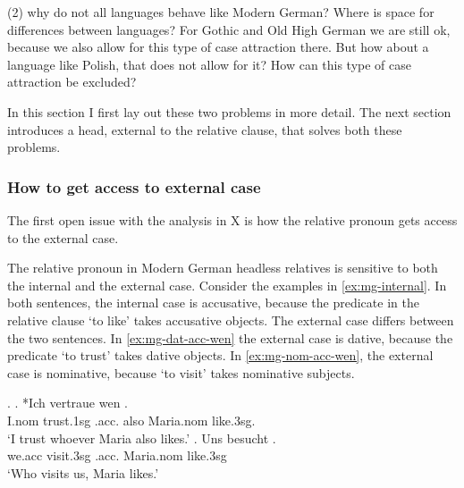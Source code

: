 (2) why do not all languages behave like Modern German? Where is space for differences between languages? For Gothic and Old High German we are still ok, because we also allow for this type of case attraction there. But how about a language like Polish, that does not allow for it? How can this type of case attraction be excluded?


In this section I first lay out these two problems in more detail. The next section introduces a head, external to the relative clause, that solves both these problems.


\subsubsection{How to get access to external case}

The first open issue with the analysis in X is how the relative pronoun gets access to the external case.

The relative pronoun in Modern German headless relatives is sensitive to both the internal and the external case. Consider the examples in \ref{ex:mg-internal}. In both sentences, the internal case is accusative, because the predicate in the relative clause  `to like' takes accusative objects. The external case differs between the two sentences. In \ref{ex:mg-dat-acc-wen} the external case is dative, because the predicate  `to trust' takes dative objects.  In \ref{ex:mg-nom-acc-wen}, the external case is nominative, because  `to visit' takes nominative subjects.

\ex.\label{ex:mg-internal}
\ag. *Ich vertraue wen   . \\
I.\ac{nom} trust.1\ac{sg}\scsub{[dat]} .\ac{acc}. also Maria.\ac{nom} like.3\ac{sg}\scsub{[acc]}.\\
`I trust whoever Maria also likes.' \label{ex:mg-dat-acc-wen}
\bg. Uns besucht   .\\
 we.\ac{acc} visit.3\ac{sg}\scsub{[nom]} .\ac{acc}. Maria.\ac{nom} like.3\ac{sg}\scsub{[acc]}\\
 `Who visits us, Maria likes.' \label{ex:mg-nom-acc-wen}

